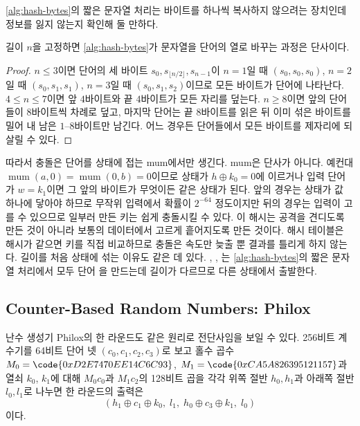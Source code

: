 \cref{alg:hash-bytes}의 짧은 문자열 처리는 바이트를 하나씩 복사하지 않으려는 장치인데 정보를 잃지 않는지 확인해 둘 만하다.

\begin{proposition}
\label{prop:hash-encoding}
길이 $n$을 고정하면 \cref{alg:hash-bytes}가 문자열을 단어의 열로 바꾸는 과정은 단사이다.
\end{proposition}

\begin{proof}
$n\le3$이면 단어의 세 바이트 $s_0,s_{\lfloor n/2\rfloor},s_{n-1}$이 $n=1$일 때 $(s_0,s_0,s_0)$, $n=2$일 때 $(s_0,s_1,s_1)$, $n=3$일 때 $(s_0,s_1,s_2)$이므로 모든 바이트가 단어에 나타난다. $4\le n\le7$이면 앞 $4$바이트와 끝 $4$바이트가 모든 자리를 덮는다. $n\ge8$이면 앞의 단어들이 $8$바이트씩 차례로 덮고, 마지막 단어는 끝 $8$바이트를 읽은 뒤 이미 섞은 바이트를 밀어 내 남은 $1$--$8$바이트만 남긴다. 어느 경우든 단어들에서 모든 바이트를 제자리에 되살릴 수 있다.
\end{proof}

따라서 충돌은 단어를 상태에 접는 mum에서만 생긴다. mum은 단사가 아니다. 예컨대 $\operatorname{mum}(a,0)=\operatorname{mum}(0,b)=0$이므로 상태가 $h\oplus k_0=0$에 이르거나 입력 단어가 $w=k_1$이면 그 앞의 바이트가 무엇이든 같은 상태가 된다. 앞의 경우는 상태가 값 하나에 닿아야 하므로 무작위 입력에서 확률이 $2^{-64}$ 정도이지만 뒤의 경우는 입력이 고를 수 있으므로 일부러 만든 키는 쉽게 충돌시킬 수 있다. 이 해시는 공격을 견디도록 만든 것이 아니라 보통의 데이터에서 고르게 흩어지도록 만든 것이다. 해시 테이블은 해시가 같으면 키를 직접 비교하므로 충돌은 속도만 늦출 뿐 결과를 틀리게 하지 않는다. 길이를 처음 상태에 섞는 이유도 같은 데 있다. , , 는 \cref{alg:hash-bytes}의 짧은 문자열 처리에서 모두 단어 을 만드는데 길이가 다르므로 다른 상태에서 출발한다.

\subsection{Counter-Based Random Numbers: Philox}

난수 생성기 Philox의 한 라운드도 같은 원리로 전단사임을 보일 수 있다\cite{salmon2011random123}. 256비트 계수기를 64비트 단어 넷 $(c_0,c_1,c_2,c_3)$로 보고 홀수 곱수 $M_0=\code{0xD2E7470EE14C6C93}$, $M_1=\code{0xCA5A826395121157}$과 열쇠 $k_0$, $k_1$에 대해 $M_0c_0$과 $M_1c_2$의 128비트 곱을 각각 위쪽 절반 $h_0,h_1$과 아래쪽 절반 $l_0,l_1$로 나누면 한 라운드의 출력은
\[
(h_1\oplus c_1\oplus k_0,\;l_1,\;h_0\oplus c_3\oplus k_1,\;l_0)
\]
이다.

